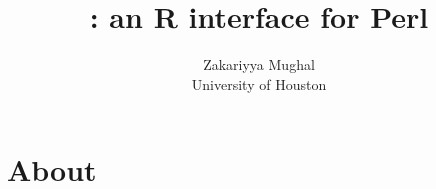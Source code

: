\documentclass[article]{jss}
\author{Zakariyya Mughal\\University of Houston}
\title{\pkg{Statistics::NiceR}: an R interface for Perl}
\begin{document}

\section[About Java]{About }
\end{document}
